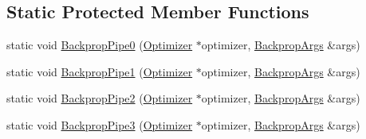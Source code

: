 \subsection*{Static Protected Member Functions}
\begin{DoxyCompactItemize}
\item 
static void \hyperlink{classfractal_1_1Optimizer_a37719e06ea61f1b0a6d77e8c75cc97d1}{Backprop\+Pipe0} (\hyperlink{classfractal_1_1Optimizer}{Optimizer} $\ast$optimizer, \hyperlink{classfractal_1_1BackpropArgs}{Backprop\+Args} \&args)
\item 
static void \hyperlink{classfractal_1_1Optimizer_acb69ea9328efed040ef54b0150f96663}{Backprop\+Pipe1} (\hyperlink{classfractal_1_1Optimizer}{Optimizer} $\ast$optimizer, \hyperlink{classfractal_1_1BackpropArgs}{Backprop\+Args} \&args)
\item 
static void \hyperlink{classfractal_1_1Optimizer_a38d36c5b2dd0d4d2d971d6d8a7d2631e}{Backprop\+Pipe2} (\hyperlink{classfractal_1_1Optimizer}{Optimizer} $\ast$optimizer, \hyperlink{classfractal_1_1BackpropArgs}{Backprop\+Args} \&args)
\item 
static void \hyperlink{classfractal_1_1Optimizer_a220eb53debdc9adc8462f993113da58d}{Backprop\+Pipe3} (\hyperlink{classfractal_1_1Optimizer}{Optimizer} $\ast$optimizer, \hyperlink{classfractal_1_1BackpropArgs}{Backprop\+Args} \&args)
\end{DoxyCompactItemize}
